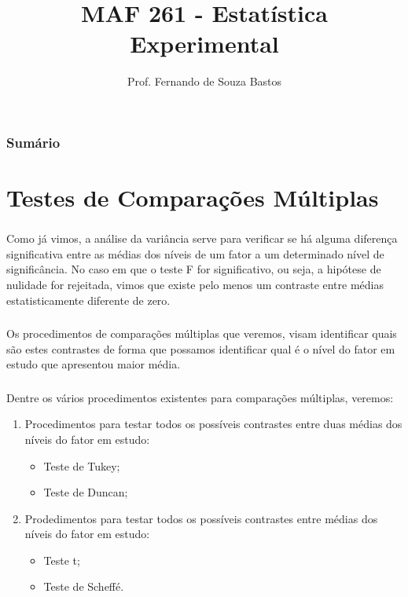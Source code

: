 \documentclass[14pt,aspectratio=1610]{beamer}
\title{MAF 261 - Estatística Experimental}
\author{Prof. Fernando de Souza Bastos}
\institute{Instituto de Ciências Exatas e Tecnológicas\texorpdfstring{\\ Universidade Federal de Viçosa}{}\texorpdfstring{\\ Campus UFV - Florestal}{}}
\date[\today]{}
\begin{document}


\frame{\titlepage}

\begin{frame}{}
\frametitle{\bf Sumário}
\tableofcontents
\end{frame}

\section{Testes de Comparações Múltiplas}
\begin{frame}{}
\frametitle{}
\begin{block}{}
\justifying
Como já vimos, a análise da variância serve para verificar se há alguma
diferença significativa entre as médias dos níveis de um fator a um
determinado nível de significância. No caso em que o teste F for 
significativo, ou seja, a hipótese de nulidade for rejeitada, vimos que
existe pelo menos um contraste entre médias estatisticamente diferente 
de zero.
\end{block}
\end{frame}

\begin{frame}{}
\frametitle{}
\begin{block}{}
\justifying
Os procedimentos de comparações múltiplas que veremos, visam identificar quais são estes contrastes de forma que possamos identificar qual é o nível do fator em estudo que apresentou maior média.
\end{block}
\end{frame}

\begin{frame}{}
\frametitle{}
\begin{block}{}
\justifying
Dentre os vários procedimentos existentes para comparações múltiplas, veremos:

\begin{enumerate}
\item Procedimentos para testar todos os possíveis contrastes entre duas médias dos níveis do fator em estudo:
\begin{itemize}
\item Teste de Tukey;\pause
\item Teste de Duncan;\pause
\end{itemize}
\item Prodedimentos para testar todos os possíveis contrastes entre médias dos níveis do fator em estudo:
\begin{itemize}
\item Teste t;\pause
\item Teste de Scheffé.
\end{itemize}
\end{enumerate}
\end{block}
\end{frame}
\end{document}
